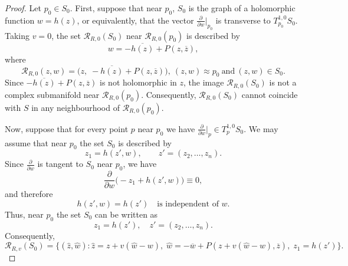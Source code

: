 \documentclass[10pt,a4paper]{amsart}
\begin{document}
\begin{proof}
Let \(p_0 \in S_0\). First, suppose that near \(p_0\), \(S_0\) is the graph of a holomorphic function \(w = h(z)\), or equivalently, that the vector \(\frac{\partial}{\partial w}\big|_{p_0}\) is transverse to \(T_{p_0}^{1,0}S_0\). Taking \(v = 0\), the set \(\mathcal R_{R,0}(S_0)\) near \(\mathcal R_{R, 0}(p_0)\) is described by
\[
w = -\overline{h(z)} + P(z,\overline{z}),
\]
where 
\[
\mathcal R_{R,0}(z,w) = \bigl(z,\; -\overline{h(z)} + P(z,\overline{z})\bigr), ~(z, w)\approx p_0 ~\text{and}~ (z, w)\in S_0.
\]
Since \(-\overline{h(z)} + P(z,\overline{z})\) is not holomorphic in \(z\), the image \(\mathcal R_{R,0}(S_0)\) is not a complex submanifold near \(\mathcal R_{R,0}(p_0)\). Consequently, \(\mathcal R_{R,0}(S_0)\) cannot coincide with \(S\) in any neighbourhood of \(\mathcal R_{R,0}(p_0)\).

Now, suppose that for every point \(p\) near \(p_0\) we have \(\frac{\partial}{\partial w}\big|_{p} \in T_p^{1,0}S_0\). 
We may assume that near \(p_0\) the set \(S_0\) is described by
\begin{equation*}
z_1 = h(z',w),\qquad z' = (z_2,\dots ,z_{n}).
\end{equation*}
Since \(\frac{\partial}{\partial w}\) is tangent to \(S_0\) near \(p_0\), we have
\begin{equation*}
\frac{\partial}{\partial w}\bigl(-z_1+h(z',w)\bigr)\equiv 0,
\end{equation*}
and therefore
\begin{equation*}
h(z',w)=h(z')\quad\text{is independent of } w.
\end{equation*}
Thus, near \(p_0\) the set \(S_0\) can be written as
\begin{equation*}
z_1 = h(z'),\quad z' = (z_2,\dots ,z_n).
\end{equation*}
Consequently,
\begin{equation*}
\mathcal R_{R,v}(S_0)=\{(\widehat z,\widehat w):\widehat z=z+v(\widehat w-w),\;\widehat w=-\overline w+P(z+v(\widehat w-w),\overline z),\;z_1=h(z')\}.
\end{equation*}


\end{proof}
\end{document}
